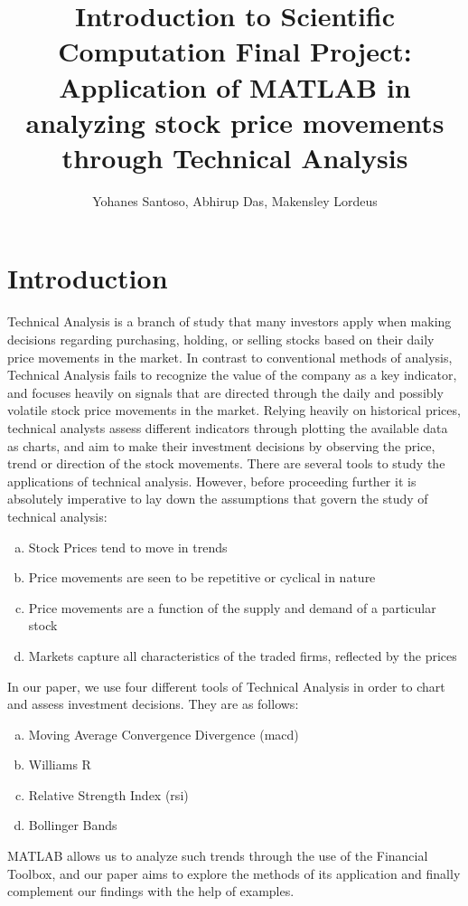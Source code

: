 \documentclass[12pt]{article}
\title{Introduction to Scientific Computation Final Project: Application of MATLAB in analyzing stock price movements through Technical Analysis}
\author{Yohanes Santoso, Abhirup Das, Makensley Lordeus}
\begin{document}
\maketitle

\section{Introduction} 
\hspace{6 mm} Technical Analysis is a branch of study that many investors apply when making decisions regarding purchasing, holding, or selling stocks based on their daily price movements in the market. In contrast to conventional methods of analysis, Technical Analysis fails to recognize the value of the company as a key indicator, and focuses heavily on signals that are directed through the daily and possibly volatile stock price movements in the market. Relying heavily on historical prices, technical analysts assess different indicators through plotting the available data as charts, and aim to make their investment decisions by observing the price, trend or direction of the stock movements. There are several tools to study the applications of technical analysis. However, before proceeding further it is absolutely imperative to lay down the assumptions that govern the study of technical analysis:
\begin{enumerate}[(a)] 
\item Stock Prices tend to move in trends
\item Price movements are seen to be repetitive or cyclical in nature
\item Price movements are a function of the supply and demand of a particular stock
\item Markets capture all characteristics of the traded firms, reflected by the prices
\end{enumerate}
\hspace{6 mm}In our paper, we use four different tools of Technical Analysis in order to chart and assess investment decisions. They are as follows:
\begin{enumerate}[(a)]
\item Moving Average Convergence Divergence (macd)
\item Williams R
\item Relative Strength Index (rsi)
\item Bollinger Bands
\end{enumerate}
\hspace{6 mm}MATLAB allows us to analyze such trends through the use of the Financial Toolbox, and our paper aims to explore the methods of its application and finally complement our findings with the help of examples.
\end{document}

